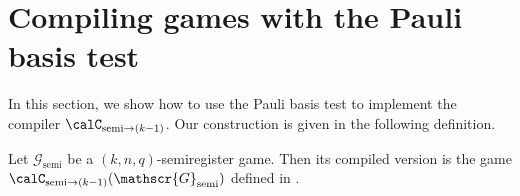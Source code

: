 \documentclass[11pt]{article}
\newcommand{\game}{\mathscr{G}}
\begin{document}
  


\section{Compiling games with the Pauli basis test}\label{sec:pauli-basis-compiler}

In this section, we show how to use the Pauli basis test to implement the compiler $\calC_{\mathrm{semi}\rightarrow (k-1)}$.
Our construction is given in the following definition.

\begin{definition}
Let $\game_{\mathrm{semi}}$ be a $(k,n,q)$-semiregister game.
Then its compiled version is the game $\calC_{\mathrm{semi} \rightarrow (k-1)}(\game_{\mathrm{semi}})$ defined in .
\end{definition}
\end{document}
